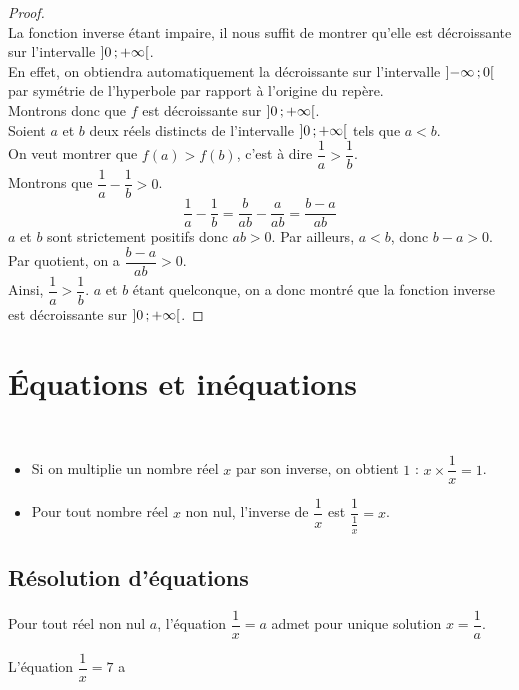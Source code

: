   \begin{proof}~\\
La fonction inverse étant impaire, il nous suffit de montrer qu'elle est décroissante sur l'intervalle $\mathopen{]}0\,;+\infty\mathclose{[}$. \\En effet, on obtiendra automatiquement la décroissante sur l'intervalle $\mathopen{]}-\infty\,;0\mathclose{[}$ par symétrie de l'hyperbole par rapport à l'origine du repère.\\
Montrons donc que $f$ est décroissante sur $\mathopen{]}0\,;+\infty\mathclose{[}$.\\
Soient $a$ et $b$ deux réels distincts de l'intervalle $\mathopen{]}0\,;+\infty\mathclose{[}$ tels que $a<b$.\\
On veut montrer que $f(a)>f(b)$, c'est à dire $\dfrac{1}{a}>\dfrac{1}{b}$.\\
Montrons que $\dfrac{1}{a}-\dfrac{1}{b}>0$.
$$\dfrac{1}{a}-\dfrac{1}{b}=\dfrac{b}{ab}-\dfrac{a}{ab}=\dfrac{b-a}{ab}$$
$a$ et $b$ sont strictement positifs donc $ab>0$. Par ailleurs, $a<b$, donc $b-a>0$. Par quotient, on a $\dfrac{b-a}{ab}>0$. \\Ainsi, $\dfrac{1}{a}>\dfrac{1}{b}$. $a$ et $b$ étant quelconque, on a donc montré que la fonction inverse est décroissante sur $\mathopen{]}0\,;+\infty\mathclose{[}$. 
  \end{proof}

\section{Équations et inéquations}
\begin{Propriété} $ $
\begin{itemize}[label=\textcolor{Couleur2}{$\bullet$}]
\item Si on multiplie un nombre réel $x$ par son inverse, on obtient $1$ : $x\times \dfrac{1}{x}=1$.
\item Pour tout nombre réel $x$ non nul, l'inverse de $\dfrac{1}{x}$ est $\dfrac{1}{\frac{1}{x}}=x$.
\end{itemize}
\end{Propriété}


\subsection{Résolution d'équations}
\begin{Définition}
Pour tout réel non nul $a$, l'équation $\dfrac{1}{x}=a$ admet pour unique solution $x=\dfrac{1}{a}$.
\end{Définition}

\begin{Exemple}
L'équation $\dfrac{1}{x}=7$ a \ligne

\end{Exemple}

